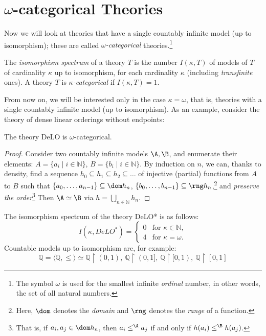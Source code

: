 \section{$\omega$-categorical Theories}\label{section:categoricity}

Now we will look at theories that have a single countably infinite model (up to isomorphism); these are called \emph{$\omega$-categorical} theories.\footnote{The symbol $\omega$ is used for the smallest infinite \emph{ordinal} number, in other words, the set of all natural numbers.}

\begin{definition}
    The \emph{isomorphism spectrum} of a theory $T$ is the number $
    I(\kappa,T)$ of models of $T$ of cardinality $\kappa$ up to isomorphism, for each cardinality $\kappa$ (including \emph{transfinite} ones). A theory $T$ is \emph{$\kappa$-categorical} if $
    I(\kappa,T)=1$.
\end{definition}

From now on, we will be interested only in the case $\kappa=\omega$, that is, theories with a single countably infinite model (up to isomorphism). As an example, consider the theory of dense linear orderings without endpoints:

\begin{proposition}
    The theory DeLO is $\omega$-categorical.
\end{proposition}
\begin{proof}
Consider two countably infinite models $\A, \B$, and enumerate their elements: $A=\{a_i \mid i\in \mathbb{N}\}$, $B=\{b_i \mid i\in \mathbb{N}\}$. By induction on $n$, we can, thanks to density, find a sequence $h_0 \subseteq h_1 \subseteq h_2 \subseteq \dots$ of injective (partial) functions from $A$ to $B$ such that $\{a_0, \dots, a_{n-1}\} \subseteq \dom h_n$, $\{b_0, \dots, b_{n-1}\} \subseteq \rng h_n$,\footnote{Here, $\dom$ denotes the \emph{domain} and $\rng$ denotes the \emph{range} of a function.} and \emph{preserve the order}\footnote{That is, if $a_i, a_j \in \dom h_n$, then $a_i \leq^\A a_j$ if and only if $h(a_i) \leq^\B h(a_j)$.} Then $\A \simeq \B$ via $h = \bigcup_{n\in \mathbb{N}} h_n$.
\end{proof}

\begin{corollary}
The isomorphism spectrum of the theory DeLO* is as follows:
$$
I(\kappa, DeLO^*)=\begin{cases}
    0 &\text{for } \kappa \in \mathbb{N},\\
    4 &\text{for } \kappa = \omega.
\end{cases}
$$
Countable models up to isomorphism are, for example:
$$ 
\mathbb{Q} = \langle \mathbb{Q}, \leq \rangle \simeq \mathbb{Q} \upharpoonright (0,1), \ \mathbb{Q} \upharpoonright (0,1], \ \mathbb{Q} \upharpoonright [0,1), \ \mathbb{Q} \upharpoonright [0,1]
$$
\end{corollary}

